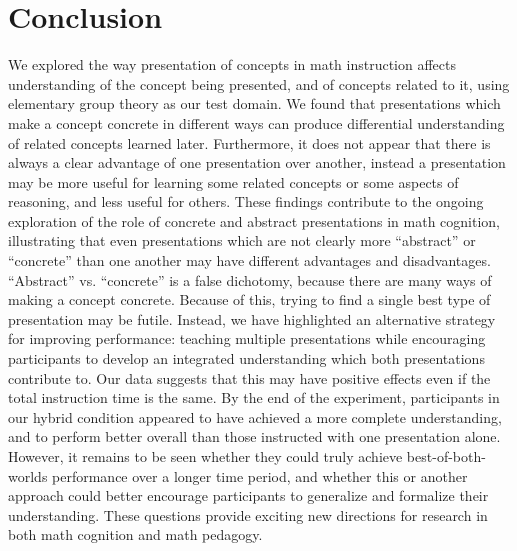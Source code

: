 \documentclass[man,10pt]{apa6}
\begin{document}
\section{Conclusion}
We explored the way presentation of concepts in math instruction affects understanding of the concept being presented, and of concepts related to it, using elementary group theory as our test domain. We found that presentations which make a concept concrete in different ways can produce differential understanding of related concepts learned later. Furthermore, it does not appear that there is always a clear advantage of one presentation over another, instead a presentation may be more useful for learning some related concepts or some aspects of reasoning, and less useful for others. These findings contribute to the ongoing exploration of the role of concrete and abstract presentations in math cognition, illustrating that even presentations which are not clearly more ``abstract'' or ``concrete'' than one another may have different advantages and disadvantages. ``Abstract'' vs. ``concrete'' is a false dichotomy, because there are many ways of making a concept concrete. Because of this, trying to find a single best type of presentation may be futile. Instead, we have highlighted an alternative strategy for improving performance: teaching multiple presentations while encouraging participants to develop an integrated understanding which both presentations contribute to. Our data suggests that this may have positive effects even if the total instruction time is the same. By the end of the experiment, participants in our hybrid condition appeared to have achieved a more complete understanding, and to perform better overall than those instructed with one presentation alone. However, it remains to be seen whether they could truly achieve best-of-both-worlds performance over a longer time period, and whether this or another approach could better encourage participants to generalize and formalize their understanding. These questions provide exciting new directions for research in both math cognition and math pedagogy. \par %
 
\end{document}
